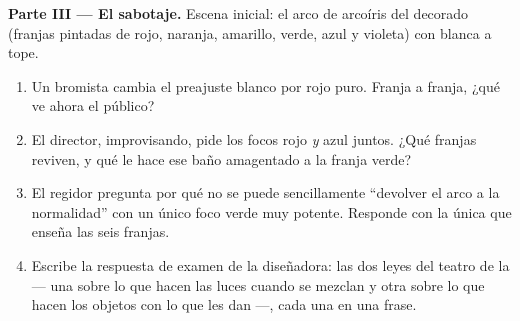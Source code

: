 \begin{problem}
\medskip\noindent\textbf{Parte III --- El sabotaje.}
Escena inicial: el arco de arcoíris del decorado (franjas pintadas de
rojo, naranja, amarillo, verde, azul y violeta) con  blanca a
tope.
\begin{enumerate}[resume]
  \item Un bromista cambia el preajuste blanco por rojo puro. Franja
        a franja, ¿qué ve ahora el público?
  \item El director, improvisando, pide los focos rojo \emph{y} azul
        juntos. ¿Qué franjas reviven, y qué le hace ese baño
        amagentado a la franja verde?
  \item El regidor pregunta por qué no se puede sencillamente
        ``devolver el arco a la normalidad'' con un único foco verde
        muy potente. Responde con la única  que enseña las
        seis franjas.
  \item Escribe la respuesta de examen de la diseñadora: las dos
        leyes del teatro de la  --- una sobre lo que hacen las
        luces cuando se mezclan y otra sobre lo que hacen los
        objetos con lo que les dan ---, cada una en una frase.
\end{enumerate}
\end{problem}
